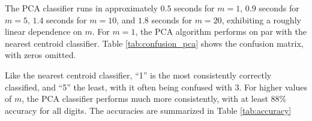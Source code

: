 \documentclass{article}
\begin{document}
The PCA classifier runs in approximately $0.5$ seconds for $m = 1$, $0.9$ seconds for $m = 5$, $1.4$ seconds for $m = 10$, and $1.8$ seconds for $m = 20$, exhibiting a roughly linear dependence on $m$. For $m = 1$, the PCA algorithm performs on par with the nearest centroid classifier. Table \ref{tab:confusion_pca} shows the confusion matrix, with zeros omitted.

\begin{table}[!htbp]
    \centering
    \caption{The confusion matrix for the PCA algorithm, with $m =1$.}
    \label{tab:confusion_pca}
\end{table}

Like the nearest centroid classifier, ``1'' is the most consistently correctly classified, and ``5'' the least, with it often being confused with $3$. For higher values of $m$, the PCA classifier performs much more consistently, with at least 88\% accuracy for all digits. The accuracies are summarized in Table \ref{tab:accuracy}
\end{document}
